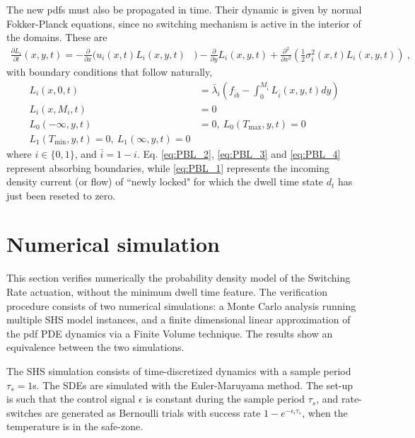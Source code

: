 \documentclass[submission,copyright,creativecommons]{eptcs}
\begin{document}
The new pdfs must also be propagated in time. Their dynamic is given by normal Fokker-Planck equations, since no switching mechanism is active in the interior of the domains. These are
\begin{align}
   \frac{\partial L_{i}}{\partial t}(x,y,t) = - \frac{\partial}{\partial x} \bigg( u_i(x,t) L_{i}(x,y,t) & \bigg)   - \frac{\partial}{\partial y} L_{i}(x,y,t)  
    + \frac{\partial^2}{\partial x^2} \left( \frac{1}{2} \sigma_i^2(x,t) L_{i}(x,y,t) \right)~, \label{eq:FP_2D}
\end{align}
with boundary conditions that follow naturally,
\begin{subequations}  \label{eq:PDE_boundary_locked}  
\begin{align} 
    L_i(x,0,t) &= \bar{\lambda}_i \left(  f_{\bar{i}b} - \int_{0}^{M_{\bar{i}}} L_{\bar{i}} (x,y,t) dy \right) \label{eq:PBL_1} \\ 
    L_i(x,M_i,t) &= 0 \label{eq:PBL_2} \\
    L_0(-\infty,y,t) &= 0, ~L_0(T_{\max},y,t)=0 \label{eq:PBL_3}\\
    L_1(T_{\min},y,t)=0,~ L_1(\infty,y,t)=0 \label{eq:PBL_4}
\end{align}
\end{subequations}
where $i \in \{0,1\}$, and $\bar{i} =1-i$.  Eq. \eqref{eq:PBL_2}, \eqref{eq:PBL_3} and \eqref{eq:PBL_4} represent absorbing boundaries, while \eqref{eq:PBL_1} represents the incoming density current (or flow) of ``newly locked" for which the dwell time state $d_t$ has just been reseted to zero.









\section{Numerical simulation} \label{sec:numerical_sim}

This section verifies numerically the probability density model of the Switching Rate actuation, without the minimum dwell time feature. The verification procedure consists of two numerical simulations: a Monte Carlo analysis running multiple SHS model instances, and a finite dimensional linear approximation of the pdf PDE dynamics via a Finite Volume technique. The results show an equivalence between the two simulations.

The SHS simulation consists of time-discretized dynamics with a sample period $\tau_s=1$s. The SDEs are simulated with the Euler-Maruyama method.  The set-up is such that the control signal $\epsilon$ is constant during the sample period $\tau_s$, and rate-switches are generated as Bernoulli trials with success rate $1-e^{-\epsilon_i \tau_s}$, when the temperature is in the safe-zone. 
\end{document}
